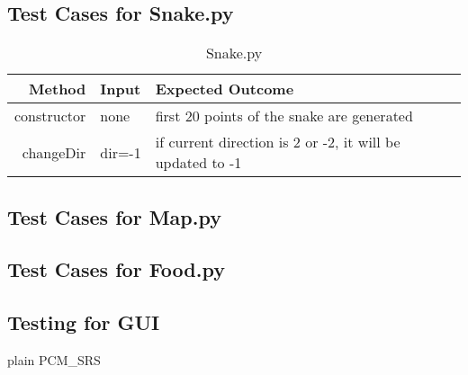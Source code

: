 \documentclass[12pt]{article}
\begin{document}
\subsection{Test Cases for Snake.py}

\begin{center}
	\begin{longtable}{ | r | p{4cm} | p{4cm} | p{4cm} |}
	\caption{Snake.py} \\ \hline \label{TblInputVar} 
	Method & Input & Expected Outcome\\ \hline
	constructor & none &  first 20 points of the snake are generated\\ \hline
	changeDir & dir=-1 & if current direction is 2 or -2, it will be updated to -1\\ \hline
	\end{longtable}
\end{center}


\subsection{Test Cases for Map.py}
\subsection{Test Cases for Food.py}
\subsection{Testing for GUI}




 {plain}
 {PCM_SRS}
\end{document}
